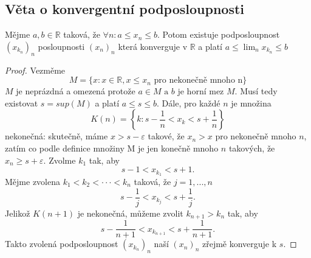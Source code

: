 \documentclass[../main.tex]{subfiles}
\begin{document}
\subsection{Věta o konvergentní podposloupnosti}
\begin{theorem}
	Mějme $a,b \in \mathbb{R}$ taková, že $\forall n: a \leq x_n \leq b$. Potom existuje podposloupnost
	$(x_{k_n})_n$ posloupnosti $(x_n)_n$ která konverguje v $\mathbb{R}$ a platí
	$a \leq \lim_n x_{k_n} \leq b$
\end{theorem}

\begin{proof}
	Vezměme \[M = \{x : x \in \mathbb{R}, x \leq x_n \text{ pro nekonečně mnoho n}\}\]
	$M$ je neprázdná a omezená protože $a \in M \text{ a } b$ je horní mez $M$. Musí tedy existovat $s = sup(M)$ a platí 
	$a \leq s \leq b$. Dále, pro každé $n$ je množina 
	\[K(n) = \left\{k : s - \frac{1}{n} < x_k < s + \frac{1}{n}\right\}\]
	nekonečná: skutečně, máme $x > s - \varepsilon$ takové, že $x_n > x$ pro nekonečně mnoho $n$, zatím co podle definice množiny M je jen
	konečně mnoho $n$ takových, že $x_n \geq s + \varepsilon$. 
	Zvolme $k_1$ tak, aby
	\[s - 1 < x_{k_{1}} < s+1.\]
	Mějme zvolena $k_1 < k_2 < \cdot \cdot \cdot < k_n$ taková, že $j = 1,...,n$
	\[s - \frac{1}{j} < x_{k_j} < s + \frac{1}{j}.\]
	Jelikož $K(n+1)$ je nekonečná, můžeme zvolit $k_{n+1} > k_n$ tak, aby
	\[s - \frac{1}{n+1} < x_{k_{n+1}} < s + \frac{1}{n+1}.\]
	Takto zvolená podposloupnost $(x_{k_n})_n$ naší $(x_n)_n$ zřejmě konverguje k $s$.
\end{proof}
\end{document}
